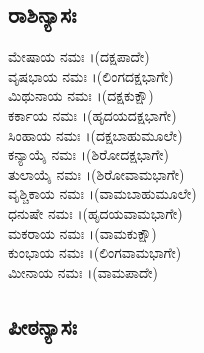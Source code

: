 \subsection{ರಾಶಿನ್ಯಾಸಃ}
 
 ಮೇಷಾಯ ನಮಃ ।(ದಕ್ಷಪಾದೇ)\\
 ವೃಷಭಾಯ ನಮಃ ।(ಲಿಂಗದಕ್ಷಭಾಗೇ)\\
 ಮಿಥುನಾಯ ನಮಃ ।(ದಕ್ಷಕುಕ್ಷೌ)\\
 ಕರ್ಕಾಯ ನಮಃ ।(ಹೃದಯದಕ್ಷಭಾಗೇ)\\
 ಸಿಂಹಾಯ ನಮಃ ।(ದಕ್ಷಬಾಹುಮೂಲೇ)\\
 ಕನ್ಯಾಯೈ ನಮಃ ।(ಶಿರೋದಕ್ಷಭಾಗೇ)\\
 ತುಲಾಯೈ ನಮಃ ।(ಶಿರೋವಾಮಭಾಗೇ)\\
 ವೃಶ್ಚಿಕಾಯ ನಮಃ ।(ವಾಮಬಾಹುಮೂಲೇ)\\
 ಧನುಷೇ ನಮಃ ।(ಹೃದಯವಾಮಭಾಗೇ)\\
 ಮಕರಾಯ ನಮಃ ।(ವಾಮಕುಕ್ಷೌ)\\
 ಕುಂಭಾಯ ನಮಃ ।(ಲಿಂಗವಾಮಭಾಗೇ)\\
 ಮೀನಾಯ ನಮಃ ।(ವಾಮಪಾದೇ)
\eject
\subsection{ಪೀಠನ್ಯಾಸಃ}

